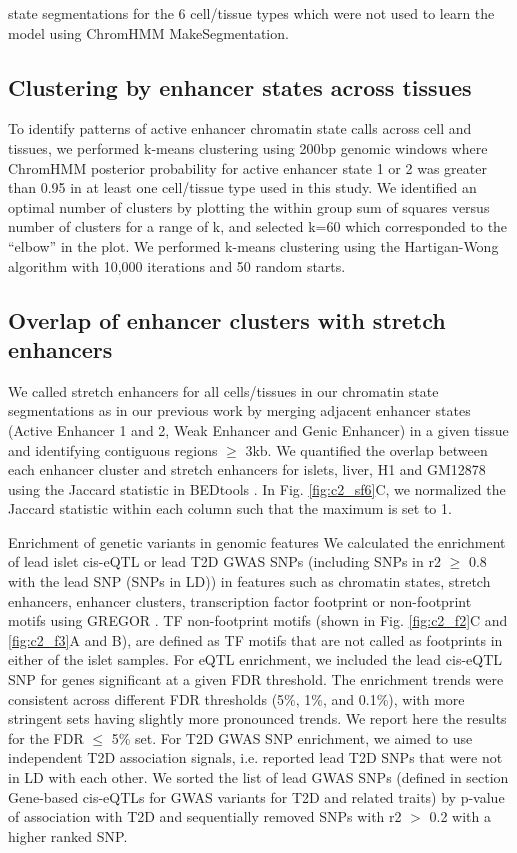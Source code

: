 state segmentations for the 6 cell/tissue types which were not used to learn the model using ChromHMM MakeSegmentation. 

\subsection{Clustering by enhancer states across tissues} 
To identify patterns of active enhancer chromatin state calls across cell and tissues, we performed k-means clustering using 200bp genomic windows where ChromHMM posterior probability for active enhancer state 1 or 2 was greater than 0.95 in at least one cell/tissue type used in this study. We identified an optimal number of clusters by plotting the within group sum of squares versus number of clusters for a range of k, and selected k=60 which corresponded to the “elbow” in the plot. We performed k-means clustering using the Hartigan-Wong algorithm with 10,000 iterations and 50 random starts.

\subsection{Overlap of enhancer clusters with stretch enhancers}
We called stretch enhancers for all cells/tissues in our chromatin state segmentations as in our previous work  \cite{scottGeneticRegulatorySignature2016, parkerChromatinStretchEnhancer2013} by merging adjacent enhancer states (Active Enhancer 1 and 2, Weak Enhancer and Genic Enhancer) in a given tissue and identifying contiguous regions $\geq$ 3kb. We quantified the overlap between each enhancer cluster and stretch enhancers for islets, liver, H1 and GM12878 using the Jaccard statistic in BEDtools \cite{quinlanBEDToolsFlexibleSuite2010}. In Fig. \ref{fig:c2_sf6}C, we normalized the Jaccard statistic within each column such that the maximum is set to 1.

Enrichment of genetic variants in genomic features We calculated the enrichment of lead islet cis-eQTL or lead T2D GWAS SNPs (including SNPs in r2 $\geq$ 0.8 with the lead SNP (SNPs in LD)) in features such as chromatin states, stretch enhancers, enhancer clusters, transcription factor footprint or non-footprint motifs using GREGOR \cite{schmidtGREGOREvaluatingGlobal2015}. TF non-footprint motifs (shown in Fig. \ref{fig:c2_f2}C and \ref{fig:c2_f3}A and B), are defined as TF motifs that are not called as footprints in either of the islet samples. For eQTL enrichment, we included the lead cis-eQTL SNP for genes significant at a given FDR threshold. The enrichment trends were consistent across different FDR thresholds (5\%, 1\%, and 0.1\%), with more stringent sets having slightly more pronounced trends. We report here the results for the FDR $\leq$ 5\% set. For T2D GWAS SNP enrichment, we aimed to use independent T2D association signals, i.e. reported lead T2D SNPs that were not in LD with each other. We sorted the list of lead GWAS SNPs (defined in section Gene-based cis-eQTLs for GWAS variants for T2D and related traits) by p-value of association with T2D and sequentially removed SNPs with r2 $>$ 0.2 with a higher ranked SNP. 

